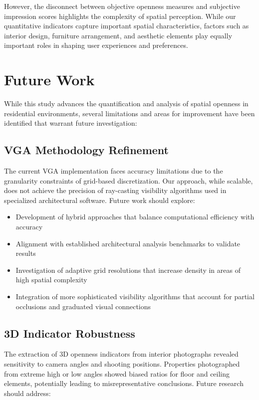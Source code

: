However, the disconnect between objective openness measures and subjective impression scores 
highlights the complexity of spatial perception. While our quantitative indicators capture important 
spatial characteristics, factors such as interior design, furniture arrangement, and aesthetic 
elements play equally important roles in shaping user experiences and preferences.

\section{Future Work}

While this study advances the quantification and analysis of spatial openness in residential 
environments, several limitations and areas for improvement have been identified that warrant future 
investigation:

\subsection{VGA Methodology Refinement}

The current VGA implementation faces accuracy limitations due to the granularity constraints of 
grid-based discretization. Our approach, while scalable, does not achieve the precision of 
ray-casting visibility algorithms used in specialized architectural software. Future work should 
explore:

\begin{itemize}
    \item Development of hybrid approaches that balance computational efficiency with accuracy
    \item Alignment with established architectural analysis benchmarks to validate results
    \item Investigation of adaptive grid resolutions that increase density in areas of high spatial 
    complexity
    \item Integration of more sophisticated visibility algorithms that account for partial occlusions 
    and graduated visual connections
\end{itemize}

\subsection{3D Indicator Robustness}

The extraction of 3D openness indicators from interior photographs revealed sensitivity to camera 
angles and shooting positions. Properties photographed from extreme high or low angles showed biased 
ratios for floor and ceiling elements, potentially leading to misrepresentative conclusions. Future 
research should address:

